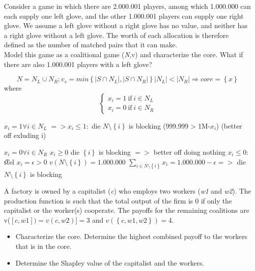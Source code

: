 \documentclass[../main.tex]{subfiles}
\begin{document}

\begin{question}

Consider a game in which there are 2.000.001 players, among which 1.000.000 can each supply one left glove, and the other 1.000.001 players can supply one right glove. We assume a left glove without a right glove has no value, and neither has a right glove without a left glove. The worth of each allocation is therefore defined as the number of matched pairs that it can make.\\

Model this game as a coalitional game (\textit{N},v) and characterize the core. What if there are also 1.000.001 players with a left glove?

\end{question}

\begin{solution} 
\[
N = N_L \cup N_R; v_s = min \left\{ |S \cap N_L|, |S \cap N_R| \right\}
|N_L| < |N_R| \Rightarrow core = \left\{x\right\} 
\]
where 
\[
\begin{cases}
 x_i = 1 ~ \text{if} ~ i \in N_L \\
 x_i = 0 ~ \text{if} ~ i \in N_R
\end{cases}
\]


$x_i = 1 \forall i \in N_L$ \newline
$=> x_i \leq 1:$ die $N \setminus \left\{i\right\}$ is blocking (999.999 > 1M-$x_i$) (better off exluding i)

$x_i = 0 \forall i \in N_R$ \newline
	$x_i \geq 0$ die $\left\{i\right\}$ is blocking $=>$ better off doing nothing \newline
	$x_i \leq 0$: \newline
	\t	stel $x_i = \epsilon > 0$ \newline
			$v(N \setminus \left\{i\right\}) = 1.000.000$ \newline 
			$\sum_{i \in N\setminus\left\{i\right\}} x_i = 1.000.000 - \epsilon =>$ die $N\setminus\left\{i\right\}$ is blocking
\end{solution}

\begin{question}[Capitalism]
A factory is owned by a capitalist (\textit{c}) who employs two workers (\textit{w1} and \textit{w2}). The production function is such that the total output of the firm is 0 if only the capitalist or the worker(s) cooperate. The payoffs for the remaining coalitions are v($[c,w1]) = v(c,w2)] = 3$ and $v(\left\{c,w1,w2\right\})=4$.

    \begin{itemize}
        \item Characterize the core. Determine the highest combined payoff to the workers that is in the core.
        \item Determine the Shapley value of the capitalist and the workers.
    \end{itemize}
\end{question}
\end{document}
